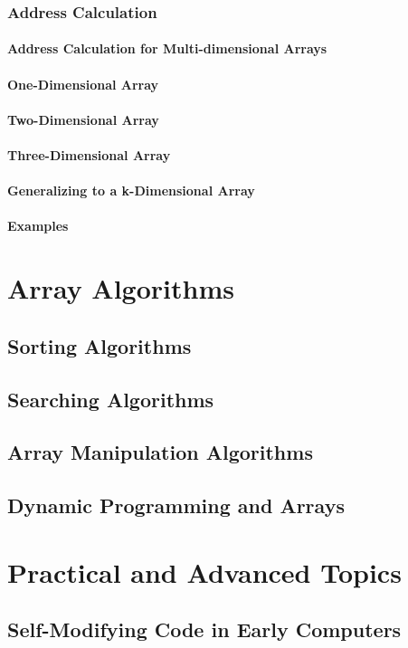 \documentclass[12pt, oneside]{book}
\begin{document}
\subsection{Address Calculation}
\subsubsection{Address Calculation for Multi-dimensional Arrays}
\subsubsection{One-Dimensional Array}
\subsubsection{Two-Dimensional Array}
\subsubsection{Three-Dimensional Array}
\subsubsection{Generalizing to a k-Dimensional Array}
\subsubsection{Examples}
\chapter{Array Algorithms}
\section{Sorting Algorithms}
\section{Searching Algorithms}
\section{Array Manipulation Algorithms}
\section{Dynamic Programming and Arrays}
\chapter{Practical and Advanced Topics}
\section{Self-Modifying Code in Early Computers}
\end{document}
